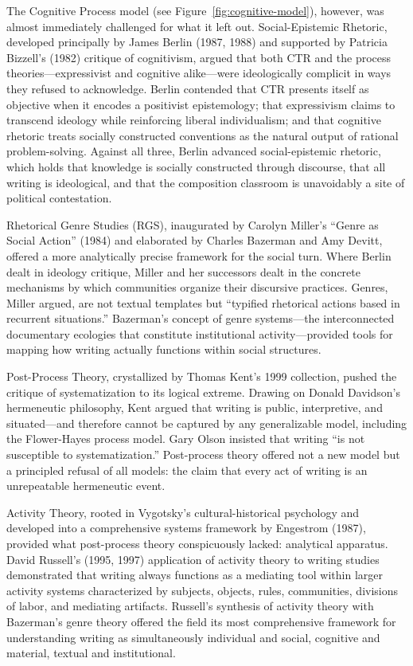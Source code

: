 \documentclass[12pt]{article}
\begin{document}
The Cognitive Process model (see Figure~\ref{fig:cognitive-model}), however, was almost immediately challenged for what it left out. Social-Epistemic Rhetoric, developed principally by James Berlin (1987, 1988) and supported by Patricia Bizzell's (1982) critique of cognitivism, argued that both CTR and the process theories---expressivist and cognitive alike---were ideologically complicit in ways they refused to acknowledge. Berlin contended that CTR presents itself as objective when it encodes a positivist epistemology; that expressivism claims to transcend ideology while reinforcing liberal individualism; and that cognitive rhetoric treats socially constructed conventions as the natural output of rational problem-solving. Against all three, Berlin advanced social-epistemic rhetoric, which holds that knowledge is socially constructed through discourse, that all writing is ideological, and that the composition classroom is unavoidably a site of political contestation.

Rhetorical Genre Studies (RGS), inaugurated by Carolyn Miller's ``Genre as Social Action'' (1984) and elaborated by Charles Bazerman and Amy Devitt, offered a more analytically precise framework for the social turn. Where Berlin dealt in ideology critique, Miller and her successors dealt in the concrete mechanisms by which communities organize their discursive practices. Genres, Miller argued, are not textual templates but ``typified rhetorical actions based in recurrent situations.'' Bazerman's concept of genre systems---the interconnected documentary ecologies that constitute institutional activity---provided tools for mapping how writing actually functions within social structures.

Post-Process Theory, crystallized by Thomas Kent's 1999 collection, pushed the critique of systematization to its logical extreme. Drawing on Donald Davidson's hermeneutic philosophy, Kent argued that writing is public, interpretive, and situated---and therefore cannot be captured by any generalizable model, including the Flower-Hayes process model. Gary Olson insisted that writing ``is not susceptible to systematization.'' Post-process theory offered not a new model but a principled refusal of all models: the claim that every act of writing is an unrepeatable hermeneutic event.

Activity Theory, rooted in Vygotsky's cultural-historical psychology and developed into a comprehensive systems framework by Engestrom (1987), provided what post-process theory conspicuously lacked: analytical apparatus. David Russell's (1995, 1997) application of activity theory to writing studies demonstrated that writing always functions as a mediating tool within larger activity systems characterized by subjects, objects, rules, communities, divisions of labor, and mediating artifacts. Russell's synthesis of activity theory with Bazerman's genre theory offered the field its most comprehensive framework for understanding writing as simultaneously individual and social, cognitive and material, textual and institutional.
\end{document}
